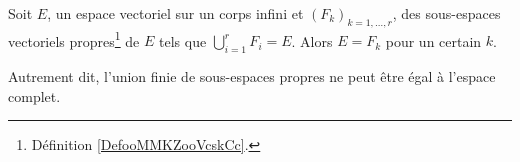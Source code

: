 \begin{proposition}   \label{PropTVKbxU}
    Soit \( E\), un espace vectoriel sur un corps infini et \( (F_k)_{k=1,\ldots, r}\), des sous-espaces vectoriels propres\footnote{Définition \ref{DefooMMKZooVcskCc}.} de \( E\) tels que \( \bigcup_{i=1}^rF_i=E\). Alors \( E=F_k\) pour un certain \( k\).

    Autrement dit, l'union finie de sous-espaces propres ne peut être égal à l'espace complet.
\end{proposition}
